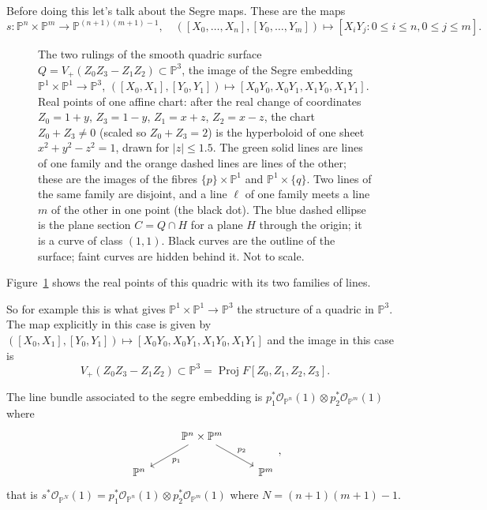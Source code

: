 \documentclass[12pt]{article}
\numberwithin{equation}{section}
\theoremstyle{definition}
\theoremstyle{remark}
\newcommand{\Ocal}{\mathcal{O}}
\newcommand{\PP}{\mathbb{P}}
\newcommand{\Proj}{\operatorname{Proj}}
\begin{document}
Before doing this let's talk about the Segre maps. 
These are the maps 
 $$s:\PP^n\times \PP^m \to \PP^{(n+1)(m+1)-1}, \quad ([X_0,\ldots,X_n],[Y_0,\ldots,Y_m]) \mapsto [X_iY_j \colon 0\leq i \leq n, 0 \leq j \leq m ].$$
\begin{figure}[H]
\centering

\caption{The two rulings of the smooth quadric surface $Q=V_+(Z_0Z_3-Z_1Z_2)\subset\PP^3$, the image of the Segre embedding $\PP^1\times\PP^1\to\PP^3$, $([X_0,X_1],[Y_0,Y_1])\mapsto[X_0Y_0,X_0Y_1,X_1Y_0,X_1Y_1]$. Real points of one affine chart: after the real change of coordinates $Z_0=1+y$, $Z_3=1-y$, $Z_1=x+z$, $Z_2=x-z$, the chart $Z_0+Z_3\neq0$ (scaled so $Z_0+Z_3=2$) is the hyperboloid of one sheet $x^2+y^2-z^2=1$, drawn for $|z|\le 1.5$. The green solid lines are lines of one family and the orange dashed lines are lines of the other; these are the images of the fibres $\{p\}\times\PP^1$ and $\PP^1\times\{q\}$. Two lines of the same family are disjoint, and a line $\ell$ of one family meets a line $m$ of the other in one point (the black dot). The blue dashed ellipse is the plane section $C=Q\cap H$ for a plane $H$ through the origin; it is a curve of class $(1,1)$. Black curves are the outline of the surface; faint curves are hidden behind it. Not to scale.}\label{fig:quadric-rulings}
\end{figure}
Figure~\ref{fig:quadric-rulings} shows the real points of this quadric with its two families of lines.

So for example this is what gives $\PP^1\times \PP^1 \to \PP^3$ the structure of a quadric in $\PP^3$. The map explicitly in this case is given by $([X_0,X_1],[Y_0,Y_1]) \mapsto [X_0Y_0,X_0Y_1,X_1Y_0,X_1Y_1]$ and the image in this case is 
$$V_+(Z_0Z_3-Z_1Z_2) \subset \PP^3 = \Proj F[Z_0,Z_1,Z_2,Z_3].$$

The line bundle associated to the segre embedding is $p_1^* \Ocal_{\PP^n}(1) \otimes p_2^*\Ocal_{\PP^m}(1)$ where 
$$\begin{tikzcd}
&\PP^n\times \PP^m \ar[dr,"p_2"]\ar[dl,"p_1"]& \\
\PP^n & & \PP^m
\end{tikzcd},$$
that is $s^*\Ocal_{\PP^N}(1) = p_1^* \Ocal_{\PP^n}(1) \otimes p_2^*\Ocal_{\PP^m}(1)$ where $N=(n+1)(m+1)-1$.
\end{document}
